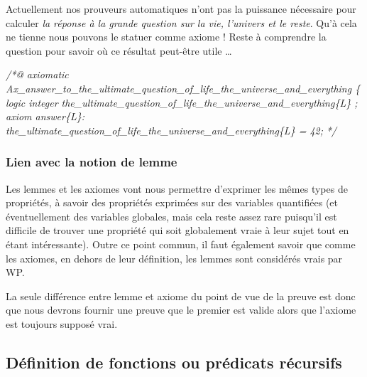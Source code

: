 \documentclass[12pt,francais,]{scrbook}
\newenvironment{Shaded}{}{}
\newcommand{\CommentTokAlt}[1]{\textcolor[rgb]{0.18,0.33,0.39}{\textit{{#1}}}}
\newenvironment{zdssecretblock}[1]{%
  \tcolorbox[beamer,%
    noparskip,breakable,
    colback=LightGray,colframe=DarkGray,%
    colbacklower=LightGray,%
    title=#1]
}{\endtcolorbox}
\begin{document}
\begin{zdssecretblock}{Hors sujet}
  Actuellement nos prouveurs automatiques
  n'ont pas la puissance nécessaire pour calculer \emph{la
    réponse à la grande question sur la vie, l'univers et le 
    reste}. Qu'à cela ne tienne nous pouvons le statuer comme axiome ! Reste
  à comprendre la question pour savoir où ce résultat peut-être
  utile \ldots{}
  \begin{footnotesize}\begin{Shaded}
\begin{Highlighting}[]
\CommentTokAlt{/*@}
\CommentTokAlt{  axiomatic Ax_answer_to_the_ultimate_question_of_life_the_universe_and_everything \{}
\CommentTokAlt{    logic integer the_ultimate_question_of_life_the_universe_and_everything\{L\} ;}
\CommentTokAlt{}
\CommentTokAlt{    axiom answer\{L\}:}
\CommentTokAlt{      the_ultimate_question_of_life_the_universe_and_everything\{L\} = 42;}
\CommentTokAlt{}
\CommentTokAlt{*/}
\end{Highlighting}
    \end{Shaded}\end{footnotesize}
\end{zdssecretblock}

\subsubsection{Lien avec la notion de
lemme}\label{lien-avec-la-notion-de-lemme}

Les lemmes et les axiomes vont nous permettre d'exprimer les mêmes types
de propriétés, à savoir des propriétés exprimées sur des variables
quantifiées (et éventuellement des variables globales, mais cela reste
assez rare puisqu'il est difficile de trouver une propriété qui soit
globalement vraie à leur sujet tout en étant intéressante). Outre ce
point commun, il faut également savoir que comme les axiomes, en dehors
de leur définition, les lemmes sont considérés vrais par WP.

La seule différence entre lemme et axiome du point de vue de la preuve
est donc que nous devrons fournir une preuve que le premier est valide
alors que l'axiome est toujours supposé vrai.

\subsection{Définition de fonctions ou prédicats
récursifs}\label{duxe9finition-de-fonctions-ou-pruxe9dicats-ruxe9cursifs}
\end{document}
